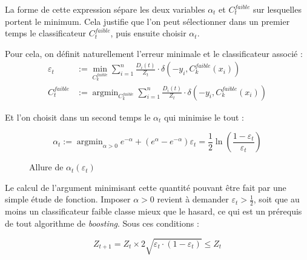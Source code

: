 \documentclass[12pt,a4paper]{article}
\DeclareMathOperator*{\argmin}{argmin}
\begin{document}
La forme de cette expression sépare les deux variables $\alpha_t$ et $C_t^{faible}$ sur lesquelles portent le minimum. Cela justifie que l'on peut sélectionner dans un premier temps le classificateur $C_t^{faible}$, puis ensuite choisir $\alpha_t$.

Pour cela, on définit naturellement l'erreur minimale et le classificateur associé :
\begin{equation*}
\begin{split}
    \varepsilon_t & := \min_{C_k^{faible}} \sum_{i=1}^n \frac{D_i(t)}{Z_t} \cdot \delta(-y_i, C_k^{faible}(x_i)) \\
    {C_t^{faible}} & := \argmin_{C_k^{faible}} \sum_{i=1}^n \frac{D_i(t)}{Z_t} \cdot \delta(-y_i, C_k^{faible}(x_i))
\end{split}
\end{equation*}

Et l'on choisit dans un second temps le $\alpha_t$ qui minimise le tout :

\begin{equation*}
    \alpha_t := \argmin_{\alpha > 0} e^{-\alpha} +  (e^{\alpha} - e^{-\alpha}) \varepsilon_t = \frac{1}{2} \ln\left(\frac{1-\varepsilon_t}{\varepsilon_t}\right)
\end{equation*}

\begin{figure}
    \caption{Allure de $\alpha_t(\varepsilon_t)$}
\end{figure}

Le calcul de l'argument minimisant cette quantité pouvant être fait par une simple étude de fonction. Imposer $\alpha > 0$ revient à demander $\varepsilon_t > \frac{1}{2}$, soit que au moins un classificateur faible classe mieux que le hasard, ce qui est un prérequis de tout algorithme de \textit{boosting}. Sous ces conditions :

\begin{equation}
    Z_{t+1} = Z_t \times 2 \sqrt{\varepsilon_t \cdot (1 - \varepsilon_t)} \leq Z_t
\end{equation}
\end{document}

